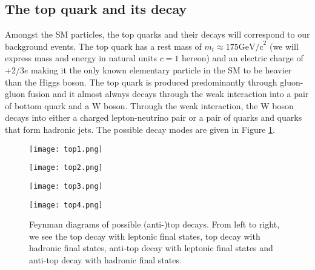 \subsection{The top quark and its decay}
Amongst the SM particles, the top quarks and their decays will correspond to our background events. The top quark has a rest mass of $m_t\approx175\text{GeV/c}^2$ (we will express mass and energy in natural units $c=1$ hereon) and an electric charge of +2/3$e$ \cite{tanabashi2018review} making it the only known elementary particle in the SM to be heavier than the Higgs boson. The top quark is produced predominantly through gluon-gluon fusion and it almost always decays through the weak interaction into a pair of bottom quark and a W boson. Through the weak interaction, the W boson decays into either a charged lepton-neutrino pair or a pair of quarks and quarks that form hadronic jets. The possible decay modes are given in Figure \ref{fig:topdecay}. \\


\begin{figure}[htbp]
    \centering
    \begin{minipage}{0.24\linewidth}
        \texttt{[image: top1.png]}
        \label{fig:top1}
    \end{minipage}
    \begin{minipage}{0.24\linewidth}
        \texttt{[image: top2.png]}
        \label{fig:anttop1}
    \end{minipage}
    \begin{minipage}{0.24\linewidth}
        \texttt{[image: top3.png]}
        \label{fig:top2}
    \end{minipage}
    \begin{minipage}{0.24\linewidth}
        \texttt{[image: top4.png]}
        \label{fig:anttop2}
    \end{minipage}
    \caption{Feynman diagrams of possible (anti-)top decays. From left to right, we see the top decay with leptonic final states, top decay with hadronic final states, anti-top decay with leptonic final states and anti-top decay with hadronic final states.}
    \label{fig:topdecay}
\end{figure}

